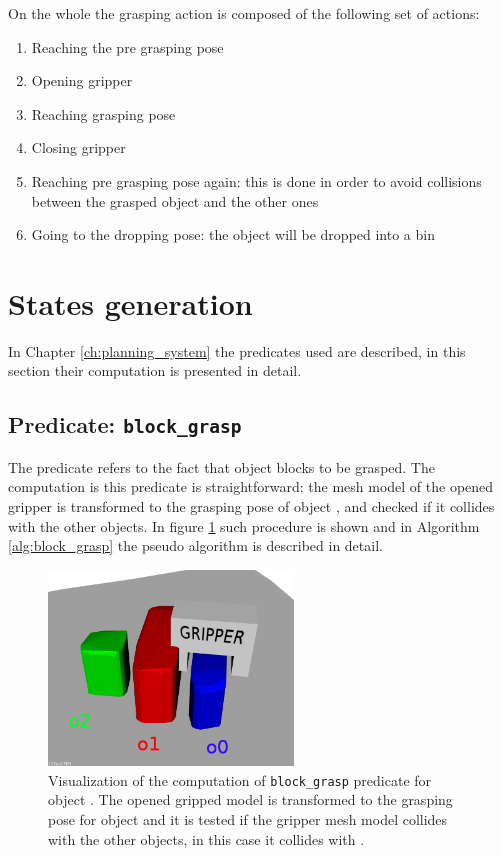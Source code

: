 On the whole the grasping action is composed of the following set of actions: 
\begin{enumerate}
\item Reaching the pre grasping pose
\item Opening gripper
\item Reaching grasping pose
\item Closing gripper
\item Reaching pre grasping pose again: this is done in order to avoid collisions between the grasped object and the other ones
\item Going to the dropping pose: the object will be dropped into a bin
\end{enumerate}

\section{States generation}
In Chapter \ref{ch:planning_system}  the predicates used are described, in this section their computation is presented in detail. 

\subsection{Predicate: \texttt{block\_grasp}}
The  predicate refers to the fact that object  blocks  to be grasped. The computation is this predicate is straightforward: the mesh model of the opened gripper is transformed to the grasping pose of object , and checked if it collides with the other objects. In figure \ref{fig:block_grasp} such procedure is shown and in Algorithm \ref{alg:block_grasp} the pseudo algorithm is described in detail. 

\begin{figure}[h]
\centering
\includegraphics[width=6.5cm]{Img/grasping/block_grasp.png}
\caption{Visualization of the computation of \texttt{block\_grasp} predicate for object . The opened gripped model is transformed to the grasping pose for object  and it is tested if the gripper mesh model collides with the other objects, in this case it collides with . }\label{fig:block_grasp}
\end{figure}

